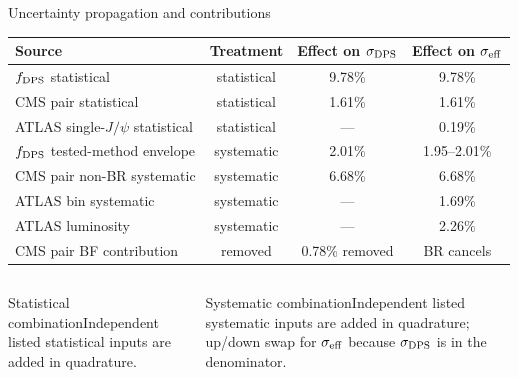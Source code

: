 \documentclass[11pt,aspectratio=169]{beamer}
\begin{document}
\begin{frame}{Uncertainty propagation and contributions}
\scriptsize\begin{center}\begin{tabular}{lccc}\toprule Source&Treatment&Effect on $\sigma_{\rm DPS}$&Effect on $\sigma_{\rm eff}$\\\midrule $f_{\rm DPS}$ statistical&statistical&9.78\%&9.78\%\\CMS pair statistical&statistical&1.61\%&1.61\%\\ATLAS single-$J/\psi$ statistical&statistical&---&0.19\%\\\midrule $f_{\rm DPS}$ tested-method envelope&systematic&2.01\%&1.95--2.01\%\\CMS pair non-BR systematic&systematic&6.68\%&6.68\%\\ATLAS bin systematic&systematic&---&1.69\%\\ATLAS luminosity&systematic&---&2.26\%\\CMS pair BF contribution&removed&0.78\% removed&BR cancels\\\bottomrule\end{tabular}\end{center}
\begin{columns}[T]\begin{block}{Statistical combination}Independent listed statistical inputs are added in quadrature.\end{block}
\begin{block}{Systematic combination}Independent listed systematic inputs are added in quadrature; up/down swap for $\sigma_{\rm eff}$ because $\sigma_{\rm DPS}$ is in the denominator.\end{block}\end{columns}
\vfill\centering{}
\end{frame}
\end{document}
